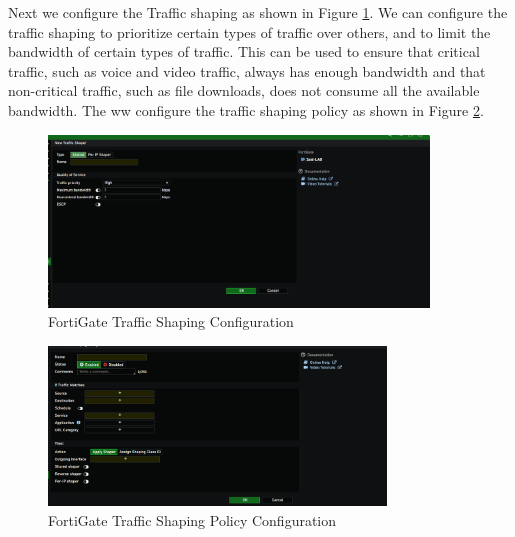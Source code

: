 \documentclass[12pt]{report}
\begin{document}
Next we configure the Traffic shaping as shown in Figure \ref{fig:ts}. We can configure the traffic shaping to prioritize certain types of traffic over others, and to limit the bandwidth of certain types of traffic. This can be used to ensure that critical traffic, such as voice and video traffic, always has enough bandwidth and that non-critical traffic, such as file downloads, does not consume all the available bandwidth. The ww configure the traffic shaping policy as shown in Figure \ref{fig:tspolicy}.
\begin{figure}
    \centering
    \includegraphics[width=0.9\textwidth]{images/Implementation/ts.png}
    \caption{FortiGate Traffic Shaping Configuration}
    \label{fig:ts}
\end{figure}
\begin{figure}
    \centering
    \includegraphics[width=0.8\textwidth]{images/Implementation/tspolicy.png}
    \caption{FortiGate Traffic Shaping Policy Configuration}
    \label{fig:tspolicy}
\end{figure}
\end{document}

